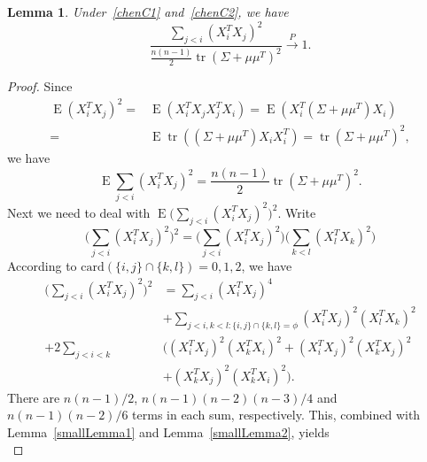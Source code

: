 \documentclass[review]{elsarticle}
\DeclareMathOperator{\mytr}{tr}
\DeclareMathOperator{\myE}{E}
\theoremstyle{plain}
\newtheorem{lemma}{Lemma}
\theoremstyle{definition}
\theoremstyle{remark}
\begin{document}
\begin{lemma}\label{ratioLemma}
    Under~\eqref{chenC1} and~\eqref{chenC2}, we have
        \begin{equation*}
        \frac{\sum_{j<i}{(X_i^T X_j)}^2}{\frac{n(n-1)}{2}\mytr  (\Sigma+\mu\mu^T)^2}
        \xrightarrow{P}1.
        \end{equation*}
\end{lemma}
\begin{proof}
    Since
        \begin{equation*}
        \begin{aligned}
            \myE(X_i^T X_j)^2=&
            \myE(X_i^T X_j X_j^T X_i)=
            \myE(X_i^T (\Sigma+\mu \mu^T) X_i)\\
            =&
            \myE\mytr ((\Sigma+\mu \mu^T) X_i X_i^T)=\mytr {(\Sigma+\mu \mu^T)}^2,
        \end{aligned}
        \end{equation*}
   we have 
        \begin{equation*}
        \myE\sum_{j<i}(X_i^T X_j)^2=\frac{n(n-1)}{2}\mytr {(\Sigma+\mu\mu^T)}^2.
        \end{equation*}
    Next we need to deal with $\myE \big(\sum_{j<i}{(X_i^T X_j)}^2\big)^2$.
    Write 
    \begin{equation*}
    \big(\sum_{j<i}{(X_i^T X_j)}^2\big)^2=
    \big(\sum_{j<i}{(X_i^T X_j)}^2\big)
    \big(\sum_{k<l}{(X_l^T X_k)}^2\big)
    \end{equation*}
    According to $\mathrm{card}(\{i,j\}\cap\{k,l\})=0,1,2$, we have
    \begin{equation*}%
    \begin{aligned}
        \big(\sum_{j<i}{(X_i^T X_j)}^2\big)^2
        &=
        \sum_{j<i}{(X_i^T X_j)}^4\\
        & +
        \sum_{j<i,k<l:\{i,j\}\cap \{k,l\}=\phi}{(X_i^T X_j)}^2{(X_l^T X_k)}^2\\
        +2\sum_{j<i<k}&\Big(
        {(X_i^T X_j)}^2{(X_k^T X_i)}^2+
{(X_i^T X_j)}^2{(X_k^T X_j)}^2\\
        &+
{(X_k^T X_j)}^2{(X_k^T X_i)}^2
        \Big).
    \end{aligned}
    \end{equation*}
    There are $n(n-1)/2$, $n(n-1)(n-2)(n-3)/4$ and $n(n-1)(n-2)/6$ terms in each sum, respectively.
    This, combined with Lemma~\ref{smallLemma1} and Lemma~\ref{smallLemma2}, yields
    \begin{equation*}

\end{equation*}
\end{proof}
\end{document}
